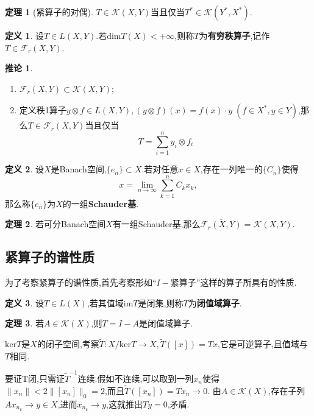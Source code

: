 \documentclass{ctexart}
\theoremstyle{definition}
\newtheorem{definition}{定义}
\newtheorem{theorem}{定理}
\newtheorem{corollary}{推论}
\theoremstyle{remark}
\newenvironment{proofsketch}{
  \renewcommand{\proofname}{证明概要}\proof}{\endproof}
\begin{document}
	\begin{theorem}[紧算子的对偶]
		$T\in\mathcal{K}(X,Y)$当且仅当$T^*\in\mathcal{K}(Y^*,X^*)$.
	\end{theorem}
	\begin{definition}
		设$T\in L(X,Y)$.若$\mathrm{dim}T(X)<+\infty$,则称$T$为\textbf{有穷秩算子},记作$T\in\mathcal{F}_r(X,Y)$.
	\end{definition}
	\begin{corollary}
		\begin{enumerate}
			\item $\mathcal{F}_r(X,Y)\subset\mathcal{K}(X,Y)$;
			\item 定义秩1算子$y\otimes f\in L(X,Y),(y\otimes f)(x)=f(x)\cdot y\;(f\in X^*,y\in Y)$,那么$T\in\mathcal{F}_r(X,Y)$当且仅当
			$$T=\sum_{i=1}^n{y_i\otimes f_i}$$
		\end{enumerate}
	\end{corollary}
	\begin{definition}
		设$X$是Banach空间,$\{e_n\}\subset X$.若对任意$x\in X$,存在一列唯一的$\{C_n\}$使得
		$$x=\lim_{n\to\infty}{\sum_{k=1}^n{C_kx_k}},$$
		那么称$\{e_n\}$为$X$的一组\textbf{Schauder基}.
	\end{definition}
	\begin{theorem}
		若可分Banach空间$X$有一组Schauder基,那么$\overline{\mathcal{F}_r(X,Y)}=\mathcal{K}(X,Y)$.
	\end{theorem}
	
	\subsection{紧算子的谱性质}
	
	为了考察紧算子的谱性质,首先考察形如``$I-$紧算子''这样的算子所具有的性质.
	
	\begin{definition}
		设$T\in L(X)$,若其值域$\mathrm{im}T$是闭集,则称$T$为\textbf{闭值域算子}.
	\end{definition}
	\begin{theorem}
		若$A\in\mathcal{K}(X)$,则$T=I-A$是闭值域算子.
	\end{theorem}
	\begin{proofsketch}
		$\mathrm{ker}T$是$X$的闭子空间,考察$\tilde{T}:X/\mathrm{ker}T\to X,\tilde{T}([x])=Tx$,它是可逆算子,且值域与$T$相同.
		
		要证$\mathrm{T}$闭,只需证$\tilde{T}^{-1}$连续.假如不连续,可以取到一列$x_n$使得$\|x_n\|<2\|[x_n]\|_0=2$,而且$\tilde{T}([x_n])=Tx_n\to 0$.
		由$A\in\mathcal{K}(X)$,存在子列$Ax_{n_k}\to y\in X$,进而$x_{n_k}\to y$,这就推出$Ty=0$,矛盾.
	\end{proofsketch}
	
\end{document}
